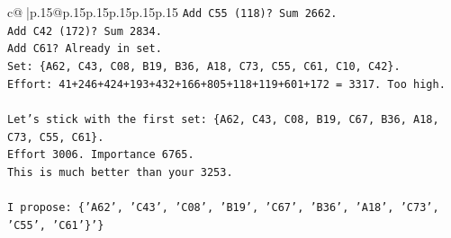 \documentclass{article}
\begin{document}
{\begin{supertabular}{c@{$\;$}|p{.15\linewidth}@{}p{.15\linewidth}p{.15\linewidth}p{.15\linewidth}p{.15\linewidth}p{.15\linewidth}}
{{{\texttt{Add C55 (118)? Sum 2662.} \\
\texttt{Add C42 (172)? Sum 2834.} \\
\texttt{Add C61? Already in set.} \\
\texttt{Set: \{A62, C43, C08, B19, B36, A18, C73, C55, C61, C10, C42\}.} \\
\texttt{Effort: 41+246+424+193+432+166+805+118+119+601+172 = 3317. Too high.} \\
\\ 
\texttt{Let's stick with the first set: \{A62, C43, C08, B19, C67, B36, A18, C73, C55, C61\}.} \\
\texttt{Effort 3006. Importance 6765.} \\
\texttt{This is much better than your 3253.} \\
\\ 
\texttt{I propose: \{'A62', 'C43', 'C08', 'B19', 'C67', 'B36', 'A18', 'C73', 'C55', 'C61'\}'\}} \\
            }
        }
    }
     \\ \\


\end{supertabular}}
\end{document}
